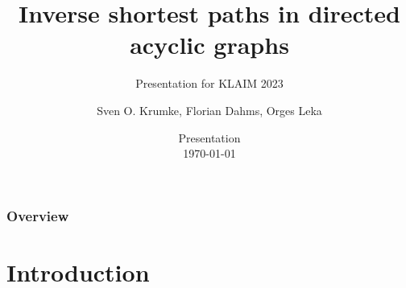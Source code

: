 \documentclass[
	11pt, %
]{beamer}
\title[Inverse shortest paths in directed acyclic graphs]{Inverse shortest paths in directed acyclic graphs} %
\subtitle{Presentation for KLAIM 2023} %
\author[Sven O. Krumke, Florian Dahms, Orges Leka]{Sven O. Krumke, Florian Dahms, Orges Leka} %
\institute[TH-Bingen]{Technische Hochschule Bingen \\ \smallskip \textit{o.leka@th-bingen.de}} %
\date[\today]{Presentation \\ \today} %
\begin{document}

\begin{frame}
	\titlepage %
\end{frame}



\begin{frame}
	\frametitle{Overview} %
	
	\tableofcontents %
\end{frame}


\section{Introduction} %
\end{document}
